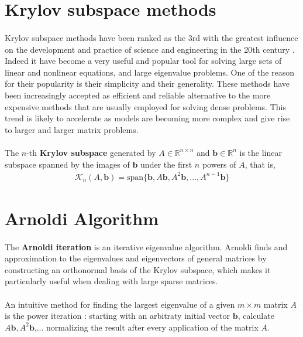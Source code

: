 \section{Krylov subspace methods}
\paragraph*{}
Krylov subspace methods \cite{Krylov1931} have been ranked as the 3rd with the greatest influence on the development and practice of science and engineering in the 20th century \cite{Dongarra2000}. Indeed it have become a very useful and popular tool for solving large sets of linear and nonlinear equations, and large eigenvalue problems. One of the reason for their popularity is their simplicity and their generality. These methods have been increasingly accepted as efficient and reliable alternative to the more expensive methods that are usually employed for solving dense problems. This trend is likely to accelerate as models are becoming more complex and give rise to larger and larger matrix problems.

\paragraph*{}
The $n$-th \textbf{Krylov subspace} generated by $A\in \mathbb{R}^{n\times n}$ and $\mathbf{b} \in \mathbb{R}^n$ is the linear subspace spanned by the images of $\mathbf{b}$ under the first $n$ powers of $A$, that is,
\begin{align}
    \mathcal{K}_n(A,\mathbf{b}) = \text{span}\{\mathbf{b}, A\mathbf{b},A^2\mathbf{b},...,A^{n-1}\mathbf{b}\}
\end{align}


\section{Arnoldi Algorithm}\label{seq:arnoldi}
\paragraph*{}
The \textbf{Arnoldi iteration} \cite{Arnoldi1951} is an iterative eigenvalue algorithm. Arnoldi finds and approximation to the eigenvalues and eigenvectors of general matrices by constructing an orthonormal basis of the Krylov subspace, which makes it particularly useful when dealing with large sparse matrices.  

\paragraph*{}
An intuitive method for finding the largest eigenvalue of a given $m\times m$ matrix $A$ is the power iteration \cite{Mises1929}: starting with an arbitraty initial vector $\mathbf{b}$, calculate $A\mathbf{b}, A^2\mathbf{b}$,... normalizing the result after every application of the matrix $A$.

